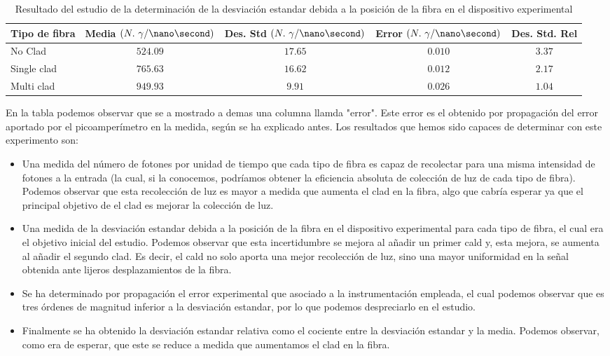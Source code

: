 \begin{table}[H]
\begin{center}
\begin{tabular}{l | c | c | c | c }
Tipo de fibra & Media $(N.~\gamma/\nano\second)$ & Des. Std $(N.~\gamma/\nano\second)$ & Error $(N.~\gamma/\nano\second)$ & Des. Std. Rel\\
\hline \hline
No Clad & $524.09$ & $17.65$ & $0.010$ & $3.37$\\ 
Single clad & $765.63$ & $16.62$ & $0.012$ & $2.17$\\
Multi clad & $949.93$ & $9.91$ & $0.026$ & $1.04$\\
\end{tabular}
\caption{Resultado del estudio de la determinación de la desviación estandar debida a la posición de la fibra en el dispositivo experimental\label{tablasigmapos}}
\end{center}
\end{table}

En la tabla podemos observar que se a mostrado a demas una columna llamda "error". Este error es el obtenido por propagación del error aportado por el picoamperímetro en la medida, según se ha explicado antes. Los resultados que hemos sido capaces de determinar con este experimento son:

\begin{itemize}

\item{} Una medida del número de fotones por unidad de tiempo que cada tipo de fibra es capaz de recolectar para una misma intensidad de fotones a la entrada (la cual, si la conocemos, podríamos obtener la eficiencia absoluta de colección de luz de cada tipo de fibra). Podemos observar que esta recolección de luz es mayor a medida que aumenta el clad en la fibra, algo que cabría esperar ya que el principal objetivo de el clad es mejorar la colección de luz.

\item{} Una medida de la desviación estandar debida a la posición de la fibra en el dispositivo experimental para cada tipo de fibra, el cual era el objetivo inicial del estudio. Podemos observar que esta incertidumbre se mejora al añadir un primer cald y, esta mejora, se aumenta al añadir el segundo clad. Es decir, el cald no solo aporta una mejor recolección de luz, sino una mayor uniformidad en la señal obtenida ante lijeros desplazamientos de la fibra.

\item{} Se ha determinado por propagación el error experimental que asociado a la instrumentación empleada, el cual podemos observar que es tres órdenes de magnitud inferior a la desviación estandar, por lo que podemos despreciarlo en el estudio.

\item{} Finalmente se ha obtenido la desviación estandar relativa como el cociente entre la desviación estandar y la media. Podemos observar, como era de esperar, que este se reduce a medida que aumentamos el clad en la fibra.

\end{itemize}
